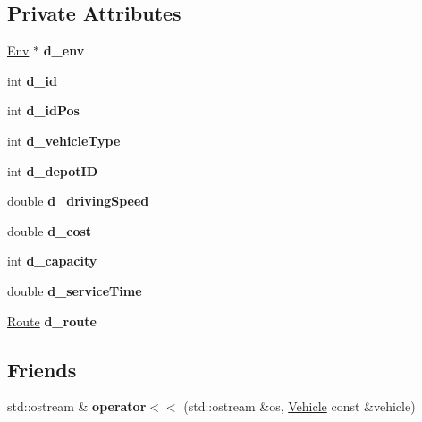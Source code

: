 \subsection*{Private Attributes}
\begin{DoxyCompactItemize}
\item 
\mbox{\label{class_vehicle_ac747e63cc697d1f8690d5ab4204840c4}} 
\hyperlink{class_env}{Env} $\ast$ {\bfseries d\+\_\+env}
\item 
\mbox{\label{class_vehicle_ac43dc59528652696b3db319ef52f8185}} 
int {\bfseries d\+\_\+id}
\item 
\mbox{\label{class_vehicle_a058ff58ef59467d28d21a529731af3e0}} 
int {\bfseries d\+\_\+id\+Pos}
\item 
\mbox{\label{class_vehicle_af140a0f32589d5582cce381c1d2e1d73}} 
int {\bfseries d\+\_\+vehicle\+Type}
\item 
\mbox{\label{class_vehicle_a6a86e014f7441ef89165c7e5ce47c1b5}} 
int {\bfseries d\+\_\+depot\+ID}
\item 
\mbox{\label{class_vehicle_ace0ade1b8f4eed589c9e6c3649fb4ec3}} 
double {\bfseries d\+\_\+driving\+Speed}
\item 
\mbox{\label{class_vehicle_a62e678a6dec05635fc5f87f5a3a239f3}} 
double {\bfseries d\+\_\+cost}
\item 
\mbox{\label{class_vehicle_aaa97b9878e02637eaddc2ff6510e45b2}} 
int {\bfseries d\+\_\+capacity}
\item 
\mbox{\label{class_vehicle_a0e6c7fd93b28501975e8c8144b6da1d7}} 
double {\bfseries d\+\_\+service\+Time}
\item 
\mbox{\label{class_vehicle_a423d1aa2a6ba43debf87f85d5b30bf29}} 
\hyperlink{class_route}{Route} {\bfseries d\+\_\+route}
\end{DoxyCompactItemize}
\subsection*{Friends}
\begin{DoxyCompactItemize}
\item 
\mbox{\label{class_vehicle_a03fb689e9f7599db1bb3e86d7b587998}} 
std\+::ostream \& {\bfseries operator$<$$<$} (std\+::ostream \&os, \hyperlink{class_vehicle}{Vehicle} const \&vehicle)
\end{DoxyCompactItemize}


